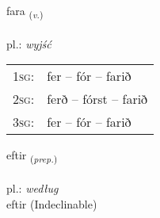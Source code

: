 \documentclass[frontgrid, backgrid]{flacards}\usepackage[]{graphicx}\usepackage[]{xcolor}
\begin{document}
\renewcommand{\flhead}{\vskip5pt \fboxsep=0pt {\small\bfseries\footnotesize Sagnorð | Verb}}
\renewcommand{\fcfoot}{\vskip5pt \fboxsep=0pt \hspace{2pt}{\small\bfseries\footnotesize 1K}}

\renewcommand{\blhead}{\vskip5pt {\small\bfseries\footnotesize Sagnorð | Verb }}
\renewcommand{\bcfoot}{\vskip5pt \hspace{2pt}{\small\bfseries\footnotesize 1K}}


{fara \small{\textsubscript{(\textit{v.})}} \\[1ex] %
\textphonetic{[faːra]} \\
pl.: \emph{wyjść} \\  [2ex]
\renewcommand*{\arraystretch}{0.8}
\begin{tabular}{p{1cm}l}
\textsc{1sg}: & fer -- fór -- farið \\ 
\textsc{2sg}: & ferð -- fórst -- farið \\ 
\textsc{3sg}: & fer -- fór -- farið \\ 
\end{tabular}
}


\renewcommand{\flhead}{\vskip5pt \fboxsep=0pt {\small\bfseries\footnotesize Forsetning | Preposition}}
\renewcommand{\fcfoot}{\vskip5pt \fboxsep=0pt \hspace{2pt}{\small\bfseries\footnotesize 1K}}

\renewcommand{\blhead}{\vskip5pt {\small\bfseries\footnotesize Forsetning | Preposition }}
\renewcommand{\bcfoot}{\vskip5pt \hspace{2pt}{\small\bfseries\footnotesize 1K}}


{eftir \small{\textsubscript{(\textit{prep.})}} \\[1ex]
\textphonetic{[ɛftɪr]} \\
pl.: \emph{według} \\  [2ex]
eftir (Indeclinable)}

\renewcommand{\flhead}{\vskip5pt \fboxsep=0pt {\small\bfseries\footnotesize Sagnorð | Verb}}
\renewcommand{\fcfoot}{\vskip5pt \fboxsep=0pt \hspace{2pt}{\small\bfseries\footnotesize 1K}}
\end{document}
